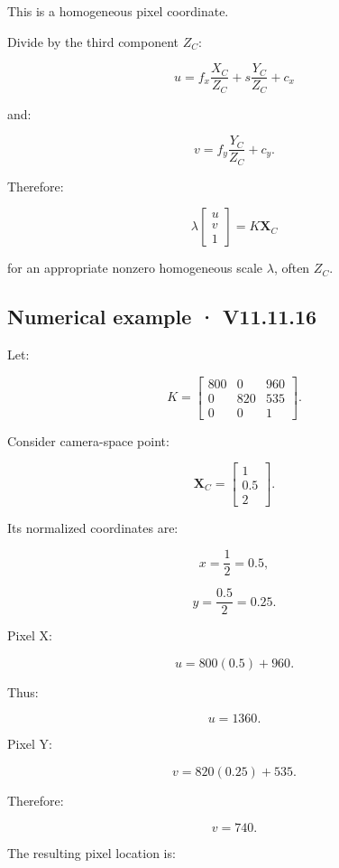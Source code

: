 This is a homogeneous pixel coordinate.

Divide by the third component \(Z_C\):

\[
 \boxed{ u=f_x\frac{X_C}{Z_C} +s\frac{Y_C}{Z_C} +c_x }
\]

and:

\[
 \boxed{ v=f_y\frac{Y_C}{Z_C} +c_y }.
\]

Therefore:

\[
 \boxed{ \lambda \begin{bmatrix}u\\v\\1\end{bmatrix} = K\mathbf X_C }
\]

for an appropriate nonzero homogeneous scale \(\lambda\), often \(Z_C\).

\subsection{Numerical example · V11.11.16}\label{02-foundations-ii-ch034-numerical-example-v11.11.16}

\hypertarget{02-foundations-ii-ch034-numerical-example-v11.11.16}{}

Let:

\[
 K= \begin{bmatrix} 800&0&960\\ 0&820&535\\ 0&0&1 \end{bmatrix}.
\]

Consider camera-space point:

\[
 \mathbf X_C= \begin{bmatrix}1\\0.5\\2\end{bmatrix}.
\]

Its normalized coordinates are:

\[
 x=\frac12=0.5,
\]

\[
 y=\frac{0.5}{2}=0.25.
\]

Pixel X:

\[
 u=800(0.5)+960.
\]

Thus:

\[
 \boxed{u=1360}.
\]

Pixel Y:

\[
 v=820(0.25)+535.
\]

Therefore:

\[
 \boxed{v=740}.
\]

The resulting pixel location is:

